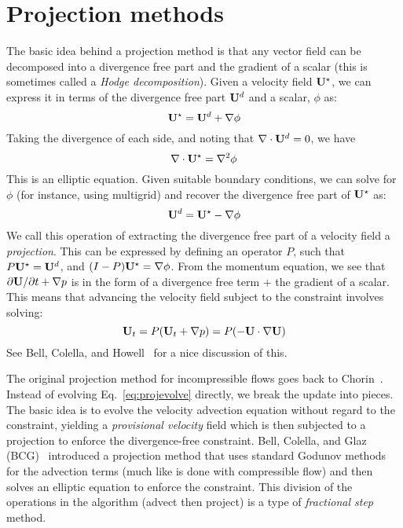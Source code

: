 \section{Projection methods}

The basic idea behind a projection method is that any vector field
can be decomposed into a divergence free part and the gradient of 
a scalar (this is sometimes called a {\em Hodge decomposition}).  
Given a velocity field ${\bf U}^\star$, we can express it in terms of the 
divergence free part ${\bf U}^d$ and a scalar, $\phi$ as:
\begin{equation}
{\bf U}^\star = {\bf U}^d + \nabla \phi
\end{equation}
Taking the divergence of each side, and noting that $\nabla \cdot {\bf U}^d
= 0$, we have
\begin{equation}
\nabla \cdot {\bf U}^\star = \nabla^2 \phi
\end{equation}
This is an elliptic equation.  Given suitable boundary conditions, we
can solve for $\phi$ (for instance, using multigrid) and recover the
divergence free part of ${\bf U}^\star$ as:
\begin{equation}
{\bf U}^d = {\bf U}^\star - \nabla \phi
\end{equation}
We call this operation of extracting the divergence free part of a
velocity field a {\em projection}.  This can be expressed by defining
an operator $P$, such that $P{\bf U}^\star = {\bf U}^d$, and $(I - P){\bf U}^\star =
\nabla \phi$.  From the momentum equation, we see that $\partial
{\bf U}/\partial t + \nabla p$ is in the form of a divergence free term
$+$ the gradient of a scalar.  This means that advancing the velocity
field subject to the constraint involves solving:
\begin{equation}
{\bf U}_t = P({\bf U}_t + \nabla p) = P(-{\bf U}\cdot \nabla {\bf U})
\label{eq:projevolve}
\end{equation}
See Bell, Colella, and Howell~\cite{BCH} for a nice discussion of this.

The original projection method for incompressible flows goes back to
Chorin~\cite{chorin:1968}.  Instead of evolving
Eq.~\ref{eq:projevolve} directly, we break the update into pieces.
The basic idea is to evolve the velocity advection equation without
regard to the constraint, yielding a {\em provisional velocity} field
which is then subjected to a projection to enforce the divergence-free
constraint.  Bell, Colella, and Glaz (BCG)~\cite{BCG} introduced a projection
method that uses standard Godunov methods for the advection terms
(much like is done with compressible flow) and then solves an elliptic
equation to enforce the constraint.  This division of the operations
in the algorithm (advect then project) is a type of {\em fractional
  step} method.

